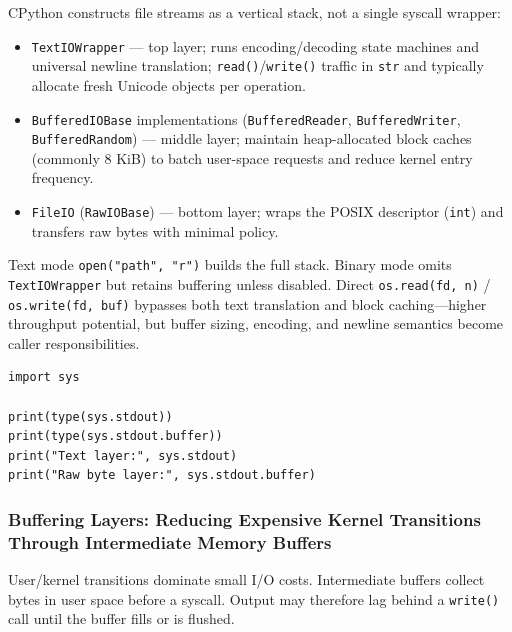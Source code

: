 CPython constructs file streams as a vertical stack, not a single syscall wrapper:

\begin{itemize}
    \item \texttt{TextIOWrapper} --- top layer; runs encoding/decoding state machines and universal newline translation; \texttt{read()}/\texttt{write()} traffic in \texttt{str} and typically allocate fresh Unicode objects per operation.
    \item \texttt{BufferedIOBase} implementations (\texttt{BufferedReader}, \texttt{BufferedWriter}, \texttt{BufferedRandom}) --- middle layer; maintain heap-allocated block caches (commonly 8 KiB) to batch user-space requests and reduce kernel entry frequency.
    \item \texttt{FileIO} (\texttt{RawIOBase}) --- bottom layer; wraps the POSIX descriptor (\texttt{int}) and transfers raw bytes with minimal policy.
\end{itemize}

Text mode \texttt{open("path", "r")} builds the full stack. Binary mode omits \texttt{TextIOWrapper} but retains buffering unless disabled. Direct \texttt{os.read(fd, n)} / \texttt{os.write(fd, buf)} bypasses both text translation and block caching---higher throughput potential, but buffer sizing, encoding, and newline semantics become caller responsibilities.

\begin{verbatim}
import sys

print(type(sys.stdout))
print(type(sys.stdout.buffer))
print("Text layer:", sys.stdout)
print("Raw byte layer:", sys.stdout.buffer)
\end{verbatim}

\subsubsection{Buffering Layers: Reducing Expensive Kernel Transitions Through Intermediate Memory Buffers}

User/kernel transitions dominate small I/O costs. Intermediate buffers collect bytes in user space before a syscall. Output may therefore lag behind a \texttt{write()} call until the buffer fills or is flushed.
